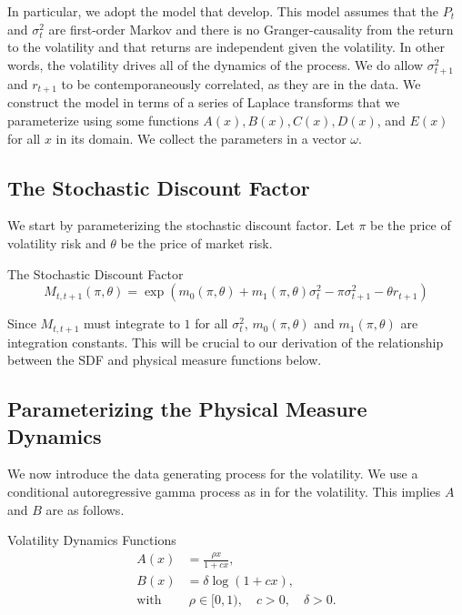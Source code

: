 \documentclass[11pt, letterpaper, twoside]{article}
\begin{document}
In particular, we adopt the model that \textcite{han2018leverage} develop. This model assumes that the $P_t$ and $\sigma^2_t$ are first-order Markov and there is no Granger-causality from the return to the volatility and that returns are independent given the volatility. In other words, the volatility drives all of the dynamics of the process. We do allow $\sigma^2_{t+1}$ and $r_{t+1}$ to be contemporaneously correlated, as they are in the data. We construct the model in terms of a series of Laplace transforms that we parameterize using some functions $A(x), B(x), C(x), D(x)$, and $E(x)$ for all $x$ in its domain. We collect the parameters in a vector $\omega$.

\subsection{The Stochastic Discount Factor}\label{sec:deriving_sdf_functions}

We start by parameterizing the stochastic discount factor. Let $\pi$ be the price of volatility risk and $\theta$ be the price of market risk.

\begin{defn}{The Stochastic Discount Factor}
 \label{defn:SDF}
 \begin{equation}
 M_{t,t+1}(\pi, \theta) = \exp\left(m_{0}(\pi, \theta) + m_1(\pi, \theta) \sigma_t^2 - \pi \sigma^2_{t+1} -
 \theta r_{t+1}\right) 
 \end{equation}
\end{defn}

Since $M_{t,t+1}$ must integrate to $1$ for all $\sigma^2_t$, $m_{0}(\pi, \theta)$ and $m_1(\pi, \theta)$ are integration constants. This will be crucial to our derivation of the relationship between the SDF and physical measure functions below.

\subsection{Parameterizing the Physical Measure Dynamics}

We now introduce the data generating process for the volatility. We use a conditional autoregressive gamma process as in \textcite{gourieroux2006autoregressive, han2018leverage} for the volatility. This implies $A$ and $B$ are as follows.

\begin{defn}{Volatility Dynamics Functions}
     \label{defn:physical_vol_dynamics}
     \begin{align}
        \label{defn:a_PP}
        A(x) &= \frac{\rho x}{1 + c x}, \\
        \label{defn:b_PP}
        B(x) &= \delta \log(1 + c x),\\
        \text{with}&\ \rho \in [0,1), \quad c > 0, \quad \delta > 0. \nonumber
     \end{align}

\end{defn}
\end{document}
